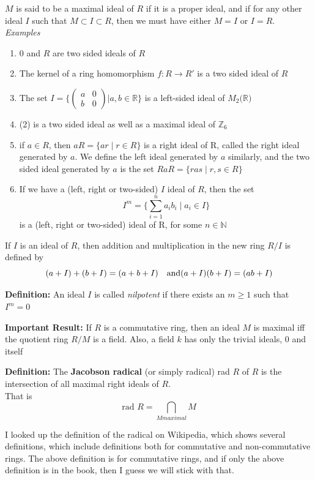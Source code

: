 \documentclass[12pt]{article}
\begin{document}
 $M$ is said to be a maximal ideal of $R$ if it is a proper ideal, and if for any other ideal $I$ such that $M\subset I\subset R$, then we must have either $M=I$ or $I=R$. \\

 \textit{Examples}
 \begin{enumerate}
 \item 0 and $R$ are two sided ideals of $R$
 \item The kernel of a ring homomorphism $f:R \to R'$ is a two sided ideal of $R$
 \item The set $I=\Biggl\{\begin{pmatrix}a & 0 \\ b & 0 \end{pmatrix}\Bigg|a,b \in \mathbb{R}\bigg\}$ is a left-sided ideal of $M_2(\mathbb{R)}$
 \item (2) is a two sided ideal as well as a maximal ideal of $\mathbb{Z}_6$
 \item if $a\in R$, then $aR=\{ar \mid r\in R\}$ is a right ideal of R, called the right ideal generated by $a$. We define the left ideal generated by $a$ similarly, and the two sided ideal generated by $a$ is the set $RaR=\{ras \mid r,s\in R\}$
 \item If we have a (left, right or two-sided) $I$ ideal of $R$, then the set 
 \[
 I^m=\{\sum_{i=1}^na_ib_i \mid a_i \in I\}
 \]is a (left, right or two-sided) ideal of R, for some $n\in \mathbb{N}$
 \end{enumerate}

 If $I$ is an ideal of $R$, then addition and multiplication in the new ring $R/I$ is defined by
 \[
 (a+I)+(b+I)=(a+b+I) \quad  \text{and} \quad \\
 (a+I)(b+I)=(ab+I)
 \]

 \textbf{Definition: } An ideal $I$ is called \textit{nilpotent} if there exists an $m \geq1$ such that $I^m=0$ 

 \textbf{Important Result: } If $R$ is a commutative ring, then an ideal $M$ is maximal iff the quotient ring $R/M$ is a field. Also, a field $k$ has only the trivial ideals, 0 and itself 

 \textbf{Definition: } The \textbf{Jacobson radical} (or simply radical) rad $R$ of $R$ is the intersection of all maximal  right ideals of $R$.\\
 That is \[
 \text {rad } R=\bigcap_{M maximal}M
 \]

 I looked up the definition of the radical on Wikipedia, which shows several definitions, which include definitions both for commutative and non-commutative rings. The above definition is for commutative rings, and if only the above definition is in the book, then I guess we will stick with that.
\end{document}
